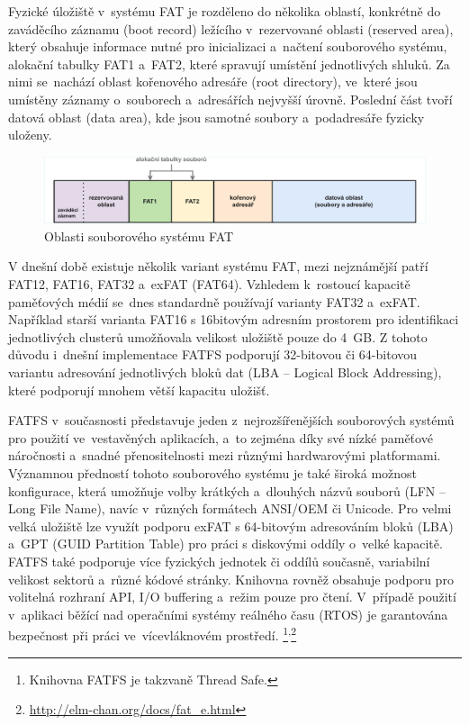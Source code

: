 Fyzické úložiště v~systému FAT je rozděleno do několika oblastí, konkrétně do zaváděcího záznamu (boot record) ležícího v~rezervované oblasti (reserved area), který obsahuje informace nutné pro inicializaci a~načtení souborového systému, alokační tabulky FAT1 a~FAT2, které spravují umístění jednotlivých shluků. Za nimi se~nachází oblast kořenového adresáře (root directory), ve~které jsou umístěny záznamy o~souborech a~adresářích nejvyšší úrovně. Poslední část tvoří datová oblast (data area), kde jsou samotné soubory a~podadresáře fyzicky uloženy.~\cite{recoverit_fat_filesystem}

\newpage

\begin{figure}[h]
    \centering
    \includegraphics[width=1.00\textwidth]{obrazky-figures/fatfs_structure-experimental_cropped.pdf}
    
    \caption{Oblasti souborového systému FAT~\cite{recoverit_fat_filesystem}}
    \label{fig:fatfs-structure}
\end{figure}

V dnešní době existuje několik variant systému FAT, mezi nejznámější patří FAT12, FAT16, FAT32 a~exFAT (FAT64). Vzhledem k~rostoucí kapacitě paměťových médií se~dnes standardně používají varianty FAT32 a~exFAT. Například starší varianta FAT16 s 16bitovým adresním prostorem pro identifikaci jednotlivých clusterů umožňovala velikost uložiště pouze do 4~GB. Z tohoto důvodu i~dnešní implementace FATFS podporují 32-bitovou či 64-bitovou variantu adresování jednotlivých bloků dat (LBA -- Logical Block Addressing), které podporují mnohem větší kapacitu uložišť.~\cite{elm_fat_filesystem_app_note}

FATFS v~současnosti představuje jeden z~nejrozšířenějších souborových systémů pro použití ve~vestavěných aplikacích, a~to zejména díky své nízké paměťové náročnosti a~snadné přenositelnosti mezi různými hardwarovými platformami. Významnou předností tohoto souborového systému je také široká možnost konfigurace, která umožňuje volby krátkých a~dlouhých názvů souborů (LFN -- Long File Name), navíc v~různých formátech ANSI/OEM či Unicode. Pro velmi velká uložiště lze využít podporu exFAT s 64-bitovým adresováním bloků (LBA) a~GPT (GUID Partition Table) pro práci s diskovými oddíly o~velké kapacitě. FATFS také podporuje více fyzických jednotek či oddílů současně, variabilní velikost sektorů a~různé kódové stránky. Knihovna rovněž obsahuje podporu pro volitelná rozhraní API, I/O buffering a~režim pouze pro čtení. V~případě použití v~aplikaci běžící nad operačními systémy reálného času (RTOS) je garantována bezpečnost při práci ve~vícevláknovém prostředí. \footnote{Knihovna FATFS je takzvaně Thread Safe.}\textsuperscript{,}\footnote{\url{http://elm-chan.org/docs/fat_e.html}}

